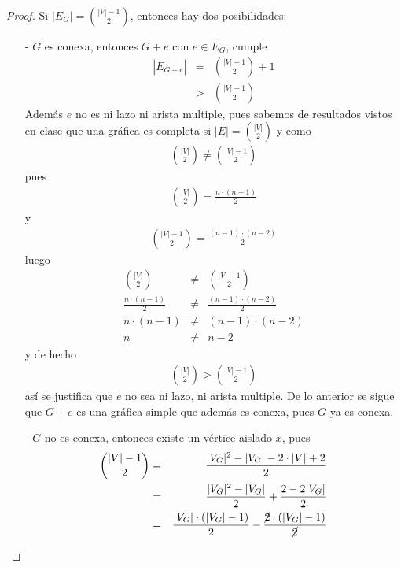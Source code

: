 \documentclass{article}
\begin{document}
\begin{enumerate}
\begin{enumerate}
  \renewcommand\qedsymbol{QED}
  \begin{proof}
    Si $|E_G| = {|V| -1 \choose 2}$, entonces hay dos posibilidades:
    \begin{itemize}
    \item[-] $G$ es conexa, entonces $G+e$ con $e \in E_G$, cumple
      \begin{eqnarray*}
        |E_{G +e}| &=& {|V| -1 \choose 2} +1\\
        &>& {|V| -1 \choose 2}
      \end{eqnarray*}
      Además $e$ no es ni lazo ni arista multiple,
      pues sabemos de resultados vistos en clase que una gráfica es completa si
      $|E| = {|V| \choose 2}$ y como
      \begin{eqnarray*}
        {|V| \choose 2} \not= {|V| -1 \choose 2}
      \end{eqnarray*}
      pues
      \begin{eqnarray*}
        {|V| \choose 2} = \frac{n \cdot (n -1)}{2}
      \end{eqnarray*}
      y
      \begin{eqnarray*}
        {|V| -1 \choose 2} = \frac{(n -1) \cdot (n -2)}{2}
      \end{eqnarray*}
      luego
      \begin{eqnarray*}
        {|V| \choose 2} &\not=& {|V| -1 \choose 2}\\
        \frac{n \cdot (n -1)}{2} &\not=& \frac{(n -1) \cdot (n -2)}{2}\\
        n \cdot (n -1) &\not=& (n -1) \cdot (n -2)\\
        n &\not=& n -2
      \end{eqnarray*}
      y de hecho
      \begin{eqnarray*}
        {|V| \choose 2} > {|V| -1 \choose 2}
      \end{eqnarray*}
      así  se justifica que $e$ no sea ni lazo, ni arista multiple. De lo anterior
      se sigue que $G +e$ es una gráfica simple que además es conexa, pues $G$ ya es
      conexa.
    \item[-] $G$ no es conexa, entonces existe un vértice aislado $x$, pues
      \begin{eqnarray*}
        {|V| -1 \choose 2} &=& \frac{|V_G|^2 -|V_G| -2 \cdot |V| +2}{2}\\
        &=& \frac{|V_G|^2 -|V_G|}{2} + \frac{2 -2|V_G|}{2}\\
        &=& \frac{|V_G| \cdot (|V_G| -1)}{2} - \frac{\cancel{2} \cdot (|V_G| -1)}{\cancel{2}}\\

\end{eqnarray*}
\end{itemize}
\end{proof}
\end{enumerate}
\end{enumerate}
\end{document}
